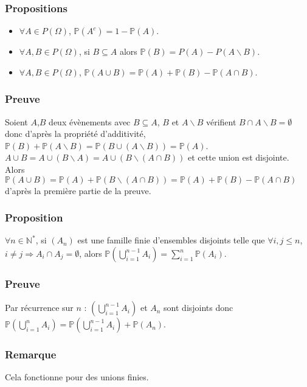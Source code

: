 \documentclass[a4paper,10pt]{book} %
\newcommand{\N}{\mathbb{N}}
\renewcommand{\P}{\mathbb{P}} %
\begin{document}
\subsubsection{Propositions}\label{prop1-II.3.1}
\begin{itemize}
\item $\forall A\in P(\Omega)$, $\P(A^c)=1-\P(A)$.
\item $\forall A,B\in P(\Omega)$, si $B\subseteq A$ alors $\P(B)=P(A)-P(A\backslash B)$.
\item $\forall A,B\in P(\Omega)$, $\P(A\cup B)=\P(A)+\P(B)-\P(A\cap B)$.
\end{itemize}

\subsubsection{Preuve}
Soient $A$,$B$ deux évènements avec $B\subseteq A$, $B$ et $A\backslash B$ vérifient $B\cap A\backslash B=\emptyset$ donc d'après la propriété d'additivité, $\P(B)+\P(A\backslash B)=\P(B\cup (A\backslash B))=\P(A)$.\\

$A\cup B=A\cup (B\backslash A)=A\cup (B\backslash (A\cap B))$ et cette union est disjointe.\\

Alors $\P(A\cup B)=\P(A)+\P(B\backslash (A\cap B))=\P(A)+\P(B)-\P(A\cap B)$ d'après la première partie de la preuve.

\subsubsection{Proposition}
$\forall n\in \N^*$, si $(A_n)$ est une famille finie d'ensembles disjoints telle que $\forall i,j\leq n$,\\$i\neq j \Rightarrow A_i\cap A_j=\emptyset$, alors $\displaystyle \P(\bigcup_{i=1}^{n-1}A_i)=\sum_{i=1}^n\P(A_i)$.

\subsubsection{Preuve}
Par récurrence sur $n$ : $\displaystyle (\bigcup_{i=1}^{n-1}A_i)$ et $A_n$ sont disjoints donc $\displaystyle \P(\bigcup_{i=1}^nA_i)=\P(\bigcup_{i=1}^{n-1}A_i)+\P(A_n)$.

\subsubsection{Remarque}
Cela fonctionne pour des unions finies.
\end{document}
